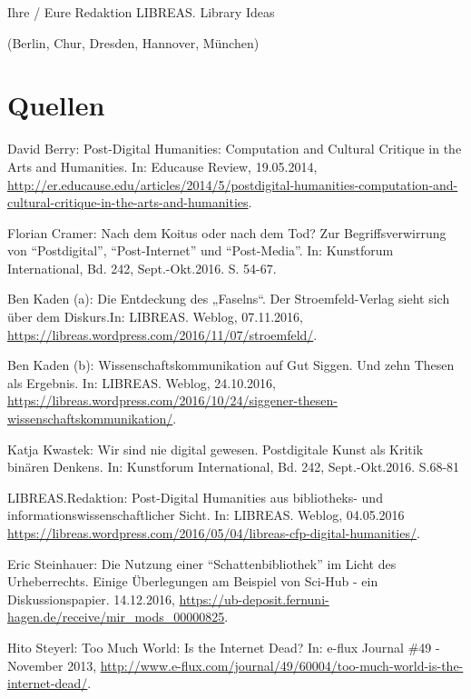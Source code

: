 \documentclass[a4paper,
fontsize=11pt,
oneside,
numbers=noperiodatend,
parskip=half-,
bibliography=totoc,
final
]{scrartcl}
\begin{document}
Ihre / Eure Redaktion LIBREAS. Library Ideas

(Berlin, Chur, Dresden, Hannover, München)

\section*{Quellen}\label{quellen}

David Berry: Post-Digital Humanities: Computation and Cultural Critique
in the Arts and Humanities. In: Educause Review, 19.05.2014,
\url{http://er.educause.edu/articles/2014/5/postdigital-humanities-computation-and-cultural-critique-in-the-arts-and-humanities}.

Florian Cramer: Nach dem Koitus oder nach dem Tod? Zur
Begriffsverwirrung von \enquote{Postdigital}, \enquote{Post-Internet}
und \enquote{Post-Media}. In: Kunstforum International, Bd. 242,
Sept.-Okt.2016. S. 54-67.

Ben Kaden (a): Die Entdeckung des „Faselns``. Der Stroemfeld-Verlag
sieht sich über dem Diskurs.In: LIBREAS. Weblog, 07.11.2016,
\url{https://libreas.wordpress.com/2016/11/07/stroemfeld/}.

Ben Kaden (b): Wissenschaftskommunikation auf Gut Siggen. Und zehn
Thesen als Ergebnis. In: LIBREAS. Weblog, 24.10.2016, \\
\url{https://libreas.wordpress.com/2016/10/24/siggener-thesen-wissenschaftskommunikation/}.

Katja Kwastek: Wir sind nie digital gewesen. Postdigitale Kunst als
Kritik binären Denkens. In: Kunstforum International, Bd. 242,
Sept.-Okt.2016. S.68-81

LIBREAS.Redaktion: Post-Digital Humanities aus bibliotheks- und
informationswissenschaftlicher Sicht. In: LIBREAS. Weblog, 04.05.2016
\url{https://libreas.wordpress.com/2016/05/04/libreas-cfp-digital-humanities/}.

Eric Steinhauer: Die Nutzung einer \enquote{Schattenbibliothek} im Licht
des Urheberrechts. Einige Überlegungen am Beispiel von Sci-Hub - ein
Diskussionspapier. 14.12.2016,
\url{https://ub-deposit.fernuni-hagen.de/receive/mir_mods_00000825}.

Hito Steyerl: Too Much World: Is the Internet Dead? In: e-flux Journal
\#49 - November 2013,
\url{http://www.e-flux.com/journal/49/60004/too-much-world-is-the-internet-dead/}.

\end{document}
